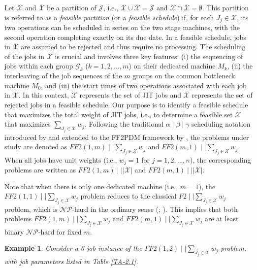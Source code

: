 \documentclass[12pt, eqno, limlimits]{article}
\newtheorem{exam}{Example}[section]
\begin{document}
\begin{sloppypar}
        Let $\mathcal{X}$ and $\overline{\mathcal{X}}$ be a partition of $\mathcal{J}$, i.e., $\mathcal{X} \cup \overline{\mathcal{X}}=\mathcal{J}$ and $\mathcal{X} \cap \overline{\mathcal{X}}=\emptyset$. This partition is referred to as a \textit{feasible partition} (or a \textit{feasible schedule}) if, for each $J_j \in \mathcal{X}$, its two operations can be scheduled in series on the two stage machines, with the second operation completing exactly on its due date. In a feasible schedule,  jobs in $\overline{\mathcal{X}}$ are assumed to be rejected and thus require no processing. The scheduling of the jobs in $\mathcal{X}$ is crucial and involves three key features: (i) the sequencing of jobs within each group $\mathcal{G}_k$ ($k=1, 2, \ldots, m$) on their dedicated machine $M_k$, (ii) the interleaving of the job sequences of the $m$ groups on the common bottleneck machine $M_0$, and (iii) the start times of two operations associated with each job in $\mathcal{X}$. In this context, $\mathcal{X}$ represents the set of JIT jobs and $\overline{\mathcal{X}}$ represents the set of rejected jobs in a feasible schedule. Our purpose is to identify a feasible schedule that maximizes the total weight of JIT jobs, i.e., to determine a feasible set $\mathcal{X}$ that maximizes $\sum_{J_j \in \mathcal{X}}w_j$. Following the traditional $\alpha \mid \beta \mid \gamma$ scheduling notation introduced by \cite{Graham1979AnDM} and extended to the FF2PDM framework by \cite{HwangLin2018COR}, the problems under study are denoted as $FF2(1, m)\mid \mid \sum_{J_j \in \mathcal{X}} w_j$ and $FF2(m, 1)\mid \mid \sum_{J_j \in \mathcal{X}} w_j$. When all jobs have unit weights (i.e., $w_j=1$ for $j=1, 2, \ldots, n$), the corresponding problems are written as $FF2(1, m)\mid \mid |\mathcal{X}|$ and $FF2(m, 1)\mid \mid |\mathcal{X}|$.
        
        Note that when there is only one dedicated machine (i.e., $m=1$), the $FF2(1, 1) \mid \mid \sum_{J_j \in \mathcal{X}} w_j$ problem reduces to the classical $F2 \mid \mid \sum_{J_j \in \mathcal{X}} w_j$ problem, which is $\mathcal{NP}$-hard in the ordinary sense (\citealp{ChoiYoon2007JOS}; \citealp{ShabtayBensoussan2012JOS}). This implies that both problems $FF2(1, m)\mid \mid \sum_{J_j \in \mathcal{X}} w_j$ and $FF2(m, 1)\mid \mid \sum_{J_j \in \mathcal{X}} w_j$ are at least binary $\mathcal{NP}$-hard for fixed $m$. 
        
        \begin{exam} \label{EX-2.1}
            Consider a 6-job instance of the $FF2(1, 2)\mid \mid \sum_{J_j \in \mathcal{X}} w_j$ problem, with job parameters listed in  Table \ref{TA-2.1}.
        \end{exam}
        

\end{sloppypar}
\end{document}
